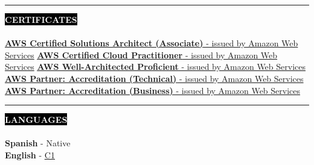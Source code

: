 \documentclass[10pt,A4]{article}
\newcounter{a}
\newcounter{b}
\newcounter{c}
\newcommand{\cvsection}[1] {
	\textcolor{white}{\MakeUppercase{\textbf{#1}}}
}
\newcommand{\cvsect}[1]{
	\colorbox{black}{{\cvsection{#1}}}\\\\%
}
\begin{document}
	
	\begin{minipage}[t]{0.8\textwidth}\hrule height 0pt width 0pt%
		\cvsect{Certificates}
		\href{https://www.credly.com/badges/dbb4510d-c80e-4bdf-bf9b-52e370013a9a}{\underline{\textbf{AWS Certified Solutions Architect (Associate)}} - issued by Amazon Web Services}\hfil\break
		\href{https://www.credly.com/badges/4f129c39-edb2-410c-91aa-d8bf8617706f}{\underline{\textbf{AWS Certified Cloud Practitioner}} - issued by Amazon Web Services}\hfil\break
		\href{https://www.credly.com/badges/1e0ac89f-4e38-4e91-93aa-3a62e7c33709}{\underline{\textbf{AWS Well-Architected Proficient}} - issued by Amazon Web Services}\hfil\break
		\href{https://www.credly.com/badges/4f7bb440-1f63-4b79-a7b1-116f16da0656}{\underline{\textbf{AWS Partner: Accreditation (Technical)}} - issued by Amazon Web Services}\hfil\break
		\href{https://www.credly.com/badges/c35e5c25-1938-4810-9489-1871644d7175}{\underline{\textbf{AWS Partner: Accreditation (Business)}} - issued by Amazon Web Services}\hfil\break
	\end{minipage}%
	\hspace{1cm}
	\begin{minipage}[t]{0.3\textwidth}\hrule height 0pt width 0pt%
		\cvsect{Languages}
		\textbf{Spanish} - Native\\
		\textbf{English} - \href{https://cert.efset.org/hqaFfD}{\underline{C1}}\\
	\end{minipage}%
	\hfill
	\vspace{0.5cm}

	
\end{document}
